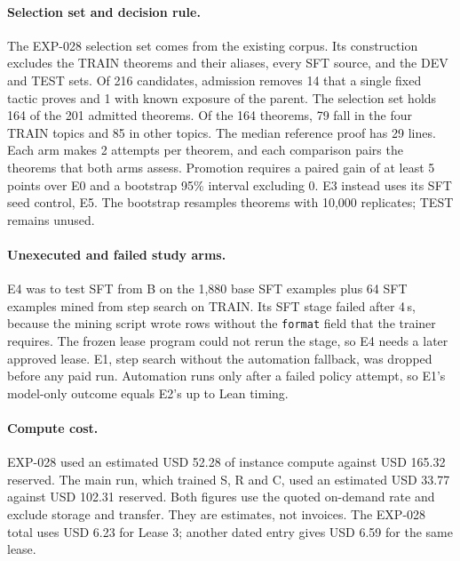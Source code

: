 \documentclass[11pt]{article}
\newcommand{\code}[1]{\texttt{#1}}
\begin{document}
\paragraph{Selection set and decision rule.}
The EXP-028 selection set comes from the existing corpus.
Its construction excludes the TRAIN theorems and their aliases, every SFT source, and the DEV and TEST sets.
Of 216 candidates, admission removes 14 that a single fixed tactic proves and 1 with known exposure of the parent.
The selection set holds 164 of the 201 admitted theorems.
Of the 164 theorems, 79 fall in the four TRAIN topics and 85 in other topics.
The median reference proof has 29 lines.
Each arm makes 2 attempts per theorem, and each comparison pairs the theorems that both arms assess.
Promotion requires a paired gain of at least 5 points over E0 and a bootstrap 95\% interval excluding 0.
E3 instead uses its SFT seed control, E5.
The bootstrap resamples theorems with 10,000 replicates; TEST remains unused.

\paragraph{Unexecuted and failed study arms.}
E4 was to test SFT from B on the 1,880 base SFT examples plus 64 SFT examples mined from step search on TRAIN.
Its SFT stage failed after 4\,s, because the mining script wrote rows without the \code{format} field that the trainer requires.
The frozen lease program could not rerun the stage, so E4 needs a later approved lease.
E1, step search without the automation fallback, was dropped before any paid run.
Automation runs only after a failed policy attempt, so E1's model-only outcome equals E2's up to Lean timing.

\paragraph{Compute cost.}
EXP-028 used an estimated USD 52.28 of instance compute against USD 165.32 reserved.
The main run, which trained S, R and C, used an estimated USD 33.77 against USD 102.31 reserved.
Both figures use the quoted on-demand rate and exclude storage and transfer.
They are estimates, not invoices.
The EXP-028 total uses USD 6.23 for Lease 3; another dated entry gives USD 6.59 for the same lease.
\end{document}
